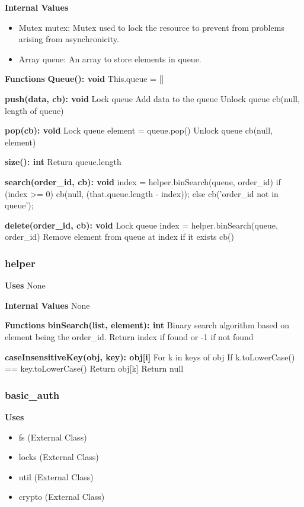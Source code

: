 \documentclass [10pt]{article}
\begin{document}
\textbf{Internal Values}
\begin{itemize}
	\item Mutex mutex: Mutex used to lock the resource to prevent from problems arising from asynchronicity.
	\item Array queue: An array to store elements in queue.
\end{itemize}

\textbf{Functions}
\textbf{Queue(): void}
This.queue = []

\textbf{push(data, cb): void}
Lock queue
Add data to the queue
Unlock queue
cb(null, length of queue)

\textbf{pop(cb): void}
Lock queue
element = queue.pop()
Unlock queue
cb(null, element)

\textbf{size(): int}
Return queue.length

\textbf{search(order\_id, cb): void}
index = helper.binSearch(queue, order\_id)
if (index >= 0) {
	cb(null, (that.queue.length - index));
} else {
	cb('order\_id not in queue');
}

\textbf{delete(order\_id, cb): void}
Lock queue
index = helper.binSearch(queue, order\_id)
Remove element from queue at index if it exists
cb()

\subsubsection{helper}
\textbf{Uses}
None

\textbf{Internal Values}
None

\textbf{Functions}
\textbf{binSearch(list, element): int}
Binary search algorithm based on element being the order\_id.
Return index if found or -1 if not found

\textbf{caseInsensitiveKey(obj, key): obj[i]}
For k in keys of obj
	If k.toLowerCase() == key.toLowerCase()
		Return obj[k]
Return null

\subsubsection{basic\_auth}
\textbf{Uses}
\begin{itemize}
	\item fs (External Class)
	\item locks (External Class)
	\item util (External Class)
	\item crypto (External Class)
\end{itemize}
\end{document}
